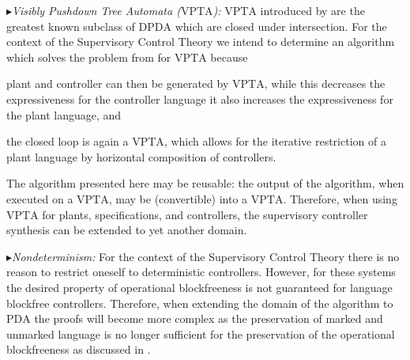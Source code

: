 \documentclass[draft]{ifacconf}
\newcommand{\PDA}{\ensuremath{\mathrm{PDA}}\xspace}
\newcommand{\DPDA}{\ensuremath{\mathrm{DPDA}}\xspace}
\newcommand{\VPTA}{\ensuremath{\mathrm{VPTA}}\xspace}
\newcommand{\myparagraph}[1]{\par$\blacktriangleright$\emph{#1:}}
\begin{document}
\myparagraph{Visibly Pushdown Tree Automata (\VPTA)}
\VPTA introduced by \cite{DBLP:conf/frocos/ChabinR07} are the greatest known subclass of \DPDA which are closed under intersection.
For the context of the Supervisory Control Theory we intend to determine an algorithm which solves the problem from  for \VPTA because
\begin{inparaenum}[(i)]
\item plant and controller can then be generated by \VPTA, while this decreases the expressiveness for the controller language it also increases the expressiveness for the plant language, and
\item the closed loop is again a \VPTA, which allows for the iterative restriction of a plant language by horizontal composition of controllers.
\end{inparaenum}
The algorithm presented here may be reusable: the output of the algorithm, when executed on a \VPTA, may be (convertible) into a \VPTA.
Therefore, when using \VPTA for plants, specifications, and controllers, the supervisory controller synthesis can be extended to yet another domain.

\myparagraph{Nondeterminism}
For the context of the Supervisory Control Theory there is no reason to restrict oneself to deterministic controllers. However, for these systems the desired property of operational blockfreeness is not guaranteed for language blockfree controllers. Therefore, when extending the domain of the algorithm to \PDA the proofs will become more complex as the preservation of marked and unmarked language is no longer sufficient for the preservation of the operational blockfreeness as discussed in \cite{SchneiderSchmuck2014}.
\end{document}
